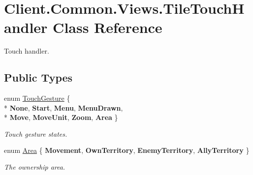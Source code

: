\hypertarget{classClient_1_1Common_1_1Views_1_1TileTouchHandler}{}\section{Client.\+Common.\+Views.\+Tile\+Touch\+Handler Class Reference}
\label{classClient_1_1Common_1_1Views_1_1TileTouchHandler}


Touch handler.  


\subsection*{Public Types}
\begin{DoxyCompactItemize}
\item 
enum \hyperlink{classClient_1_1Common_1_1Views_1_1TileTouchHandler_a623aafe142a2f68e0c4d969792eb0e76}{Touch\+Gesture} \{ \\*
{\bfseries None}, 
{\bfseries Start}, 
{\bfseries Menu}, 
{\bfseries Menu\+Drawn}, 
\\*
{\bfseries Move}, 
{\bfseries Move\+Unit}, 
{\bfseries Zoom}, 
{\bfseries Area}
 \}\begin{DoxyCompactList}\small\item\em Touch gesture states. \end{DoxyCompactList}
\item 
enum \hyperlink{classClient_1_1Common_1_1Views_1_1TileTouchHandler_a037469785439a69ce6508447be45dc6a}{Area} \{ {\bfseries Movement}, 
{\bfseries Own\+Territory}, 
{\bfseries Enemy\+Territory}, 
{\bfseries Ally\+Territory}
 \}\begin{DoxyCompactList}\small\item\em The ownership area. \end{DoxyCompactList}
\end{DoxyCompactItemize}
